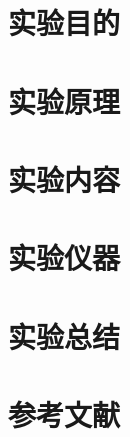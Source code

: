 \documentclass{ctexart}
\begin{document}
\section{实验目的}
\section{实验原理}
\section{实验内容}
\section{实验仪器}
\section{实验总结}
\section{参考文献}
\end{document}
